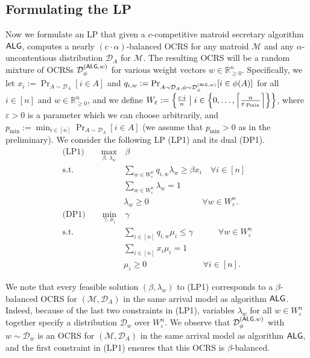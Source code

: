 \documentclass[11pt]{article}
\newcommand{\ceil}[1]{\left\lceil #1 \right\rceil}
\newcommand{\D}{\mathcal D}
\newcommand{\M}{{\mathcal M}}
\newcommand{\alg}{\textnormal{\sffamily ALG}}
\newcommand{\eps}{\varepsilon}
\newcommand{\R}{{\mathbb R}}
\begin{document}
\subsection{Formulating the LP}
Now we formulate an LP that given a $c$-competitive matroid secretary algorithm $\alg$, computes a nearly $(c\cdot\alpha)$-balanced OCRS for any matroid $\M$ and any $\alpha$-uncontentious distribution $\D_A$ for $\M$. The resulting OCRS will be a random mixture of OCRSs $\D_{\phi}^{(\alg,w)}$ for various weight vectors $w\in\R_{\ge0}^n$. Specifically, we let $x_i:=\Pr_{A\sim\D_A}[i\in A]$ and $q_{i,w}:=\Pr_{A\sim\D_A,\phi\sim\D_{\phi}^{(\alg,w)}}[i\in\phi(A)]$ for all $i\in[n]$ and $w\in\R_{\ge0}^{n}$, and we define $W_{\eps}:=\left\{\frac{\eps\cdot i}{n}\bigm\vert i\in\left\{0,\dots,\ceil{\frac{n}{\eps\cdot p_{\min}}}\right\}\right\}$, where $\eps>0$ is a parameter which we can choose arbitrarily, and $p_{\min}:=\min_{i\in[n]}\Pr_{A\sim\D_A}[i\in A]$ (we assume that $p_{\min}>0$ as in the preliminary). We consider the following LP (LP1) and its dual (DP1).
\begin{align}\label{eq:secretary_to_crs_lp_1}
    \textrm{(LP1)}\qquad\max_{\beta,\,\lambda_w}&\,\beta\nonumber\\
    \textrm{s.t. }& \sum_{w\in W_{\eps}^n} q_{i,w}\lambda_w\ge\beta x_i \quad\forall i\in [n]\nonumber\\
    & \sum_{w\in W_{\eps}^n}\lambda_w=1\nonumber\\
    & \lambda_w\ge 0 \qquad\qquad\qquad\,\,\forall w\in W_{\eps}^n.\nonumber\\
    \textrm{(DP1)}\qquad\min_{\gamma,\,\mu_i}&\,\gamma\nonumber\\
    \textrm{s.t. }& \sum_{i\in[n]} q_{i,w}\mu_i\le\gamma \qquad\,\,\,\,\,\,\forall w\in W_{\eps}^n\nonumber\\
    & \sum_{i\in[n]}x_i\mu_i=1\nonumber\\
    & \mu_i\ge 0 \qquad\qquad\qquad\,\,\,\,\forall i\in [n].
\end{align}

We note that every feasible solution $(\beta,\lambda_{w})$ to (LP1) corresponds to a $\beta$-balanced OCRS for $(\M,\D_A)$ in the same arrival model as algorithm $\alg$. Indeed, because of the last two constraints in (LP1), variables $\lambda_{w}$ for all $w\in W_{\eps}^n$ together specify a distribution $\D_{w}$ over $W_{\eps}^n$. We observe that $\D_{\phi}^{(\alg,w)}$ with $w\sim\D_{w}$ is an OCRS for $(\M,\D_A)$ in the same arrival model as algorithm $\alg$, and the first constraint in (LP1) ensures that this OCRS is $\beta$-balanced.
\end{document}
